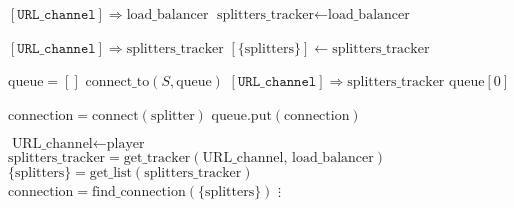 \documentclass{article}
\begin{document}
\pagestyle{empty}

\newcommand{\send}{\Rightarrow}
\newcommand{\sendto}{\rightarrow}
\algrenewcommand{}
\algrenewcommand\textproc{\textrm}

\begin{algorithmic}

  \State $[\mathtt{URL\_channel}] \send \text{load\_balancer}$
  \State \Return $\text{splitters\_tracker} \gets \text{load\_balancer}$
  \EndFunction
  
  \State $[\mathtt{URL\_channel}] \send \text{splitters\_tracker}$
  \State \Return $[\{\mathrm{splitters}\}] \gets \mathrm{splitters\_tracker}$
  \EndFunction

  \State $\mathrm{queue}=[]$
  \State $\text{connect\_to}(S, \text{queue})$
  \EndFor 
  \State $[\mathtt{URL\_channel}] \send \text{splitters\_tracker}$
  \State \Return $\mathrm{queue}[0]$
  \EndFunction

  \algrenewcommand{}

  \State $\text{connection} = \mathrm{connect}(\text{splitter})$
  \State $\text{queue}.\text{put}(\text{connection})$
  \EndIf
  \EndFunction

  \algrenewcommand{}
  
  \State $\text{URL\_channel} \gets \text{player}$
  \State $\text{splitters\_tracker} = \text{get\_tracker}(\text{URL\_channel, load\_balancer})$
  \State $\{\text{splitters}\} = \text{get\_list}(\text{splitters\_tracker})$
  \State $\text{connection} = \text{find\_connection}(\{\text{splitters}\})$
  \State $\vdots$
  \EndFunction
  \EndProcedure

\end{algorithmic}
\end{document}
